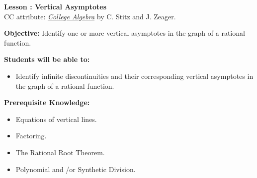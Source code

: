 \documentclass[12pt]{article}
\theoremstyle{definition}
\begin{document}
{\bf \large Lesson : Vertical Asymptotes}
\\ CC attribute: \href{http://www.stitz-zeager.com}{\it{College Algebra}} by C. Stitz and J. Zeager. 
\hfill \doclicenseImage[imagewidth=5em]\\
\par
{\bf Objective:} Identify one or more vertical asymptotes in the graph of a rational function.\\
\par
{\bf Students will be able to:}
\begin{itemize}
	\item Identify infinite discontinuities and their corresponding vertical asymptotes in the graph of a rational function.
\end{itemize}
{\bf Prerequisite Knowledge:}
\begin{itemize}
  \item Equations of vertical lines.
	\item Factoring.
	\item The Rational Root Theorem.
	\item Polynomial and \slash or Synthetic Division.
\end{itemize}
\hrulefill
\end{document}
